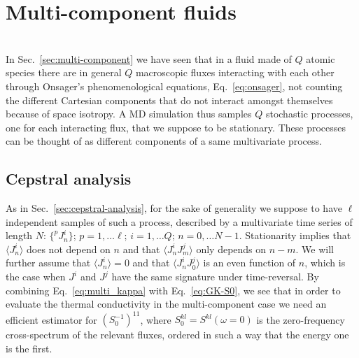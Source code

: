 \section{Multi-component fluids}  \label{sec:data-analysis-multicomponent}
\\
In Sec.~\ref{sec:multi-component} we have seen that in a fluid made of $Q$ atomic species there are in general $Q$ macroscopic fluxes interacting with each other through Onsager's phenomenological equations, Eq.~\eqref{eq:onsager}, not counting the different Cartesian components that do not interact amongst themselves because of space isotropy. A MD simulation thus samples $Q$ stochastic processes, one for each interacting flux, that we suppose to be stationary. These processes can be thought of as different components of a same multivariate process. 

\subsection{Cepstral analysis}  \label{sec:cepstral-multicomponent}
As in Sec.~\ref{sec:cepstral-analysis}, for the sake of generality we suppose to have $\ell$ independent samples of such a process, described by a multivariate time series of length $N$: $\{ ^{p\!}{J}^i_n \}$; $p=1,\dots \ell$; $i=1,\dots Q$; $n=0,\dots N-1$. Stationarity implies that $\langle {J}^i_n\rangle $ does not depend on $n$ and that $\langle {J}^i_n {J}^j_m \rangle$ only depends on $n-m$. We will further assume that $\langle {J}^i_n\rangle =0 $ and that $\langle {J}^i_n {J}^j_0 \rangle$ is an even function of $n$, which is the case when ${J}^i$ and ${J}^j$ have the same signature under time-reversal. By combining Eq.~\eqref{eq:multi_kappa} with Eq.~\eqref{eq:GK-S0}, we see that in order to evaluate the thermal conductivity in the multi-component case we need an efficient estimator for $\left ( S^{-1}_0\right )^{11}$, where $S^{kl}_0=S^{kl}(\omega=0)$ is the zero-frequency cross-spectrum of the relevant fluxes, ordered in  such a way that the energy one is the first.

